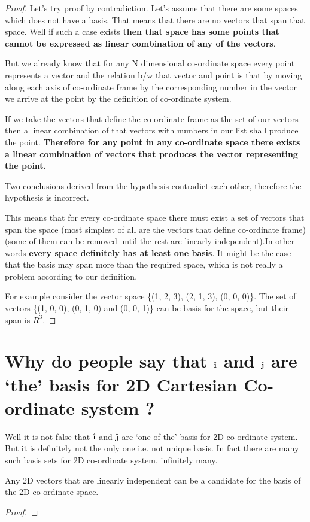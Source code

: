 \documentclass[../main.tex]{subfiles}
\begin{document}
\begin{proof}
Let's try proof by contradiction.
Let's assume that there are some spaces which does not have a basis.
That means that there are no vectors that span that space.
Well if such a case exists \textbf{then that space has some points that cannot be expressed as linear combination of any of the vectors}.

But we already know that for any N dimensional co-ordinate space every point represents a vector and the relation b/w that vector and point is that by moving along each axis of co-ordinate frame by the corresponding number in the vector we arrive at the point by the definition of co-ordinate system.

If we take the vectors that define the co-ordinate frame as the set of our vectors then a linear combination of that vectors with numbers in our list shall produce the point.
\textbf{Therefore for any point in any co-ordinate space there exists a linear combination of vectors that produces the vector representing the point.}

Two conclusions derived from the hypothesis contradict each other, therefore the hypothesis is incorrect.

This means that for every co-ordinate space there must exist a set of vectors that span the space (most simplest of all are the vectors that define co-ordinate frame) (some of them can be removed until the rest are linearly independent).In other words \textbf{every space definitely has at least one basis}. It might be the case that the basis may span more than the required space, which is not really a problem according to our definition.

For example consider the vector space \{(1, 2, 3), (2, 1, 3), (0, 0, 0)\}. The set of vectors \{(1, 0, 0), (0, 1, 0) and (0, 0, 1)\} can be basis for the space, but their span is $ R^3 $.
\end{proof}

\section{Why do people say that $ \ihat $ and $ \jhat $ are `the' basis for 2D Cartesian Co-ordinate system ?}
Well it is not false that $ \ihat $ and $ \jhat $ are `one of the' basis for 2D co-ordinate system. But it is definitely not the only one i.e. not unique basis.
In fact there are many such basis sets for 2D co-ordinate system, infinitely many.

\begin{theorem}
Any 2D vectors that are linearly independent can be a candidate for the basis of the 2D co-ordinate space.
\end{theorem}

\begin{proof}
\end{proof}

\pagebreak
\end{document}
